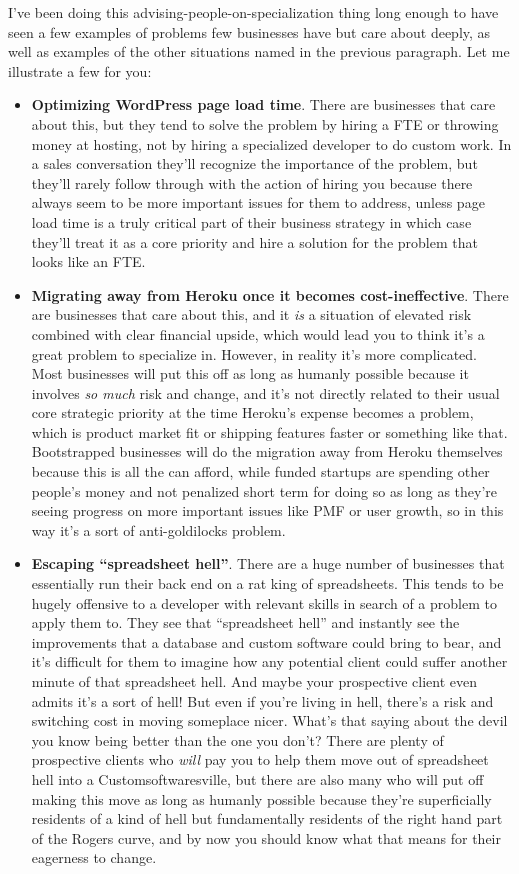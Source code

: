 I've been doing this advising-people-on-specialization thing long enough to have seen a few examples of problems few businesses have but care about deeply, as well as examples of the other situations named in the previous paragraph. Let me illustrate a few for you:

\begin{itemize}
\item \textbf{Optimizing WordPress page load time}. There are businesses that care about this, but they tend to solve the problem by hiring a FTE or throwing money at hosting, not by hiring a specialized developer to do custom work. In a sales conversation they'll recognize the importance of the problem, but they'll rarely follow through with the action of hiring you because there always seem to be more important issues for them to address, unless page load time is a truly critical part of their business strategy in which case they'll treat it as a core priority and hire a solution for the problem that looks like an FTE.
\item \textbf{Migrating away from Heroku once it becomes cost-ineffective}. There are businesses that care about this, and it \emph{is} a situation of elevated risk combined with clear financial upside, which would lead you to think it's a great problem to specialize in. However, in reality it's more complicated. Most businesses will put this off as long as humanly possible because it involves \emph{so much} risk and change, and it's not directly related to their usual core strategic priority at the time Heroku's expense becomes a problem, which is product market fit or shipping features faster or something like that. Bootstrapped businesses will do the migration away from Heroku themselves because this is all the can afford, while funded startups are spending other people's money and not penalized short term for doing so as long as they're seeing progress on more important issues like PMF or user growth, so in this way it's a sort of anti-goldilocks problem.
\item \textbf{Escaping ``spreadsheet hell''}. There are a huge number of businesses that essentially run their back end on a rat king of spreadsheets. This tends to be hugely offensive to a developer with relevant skills in search of a problem to apply them to. They see that ``spreadsheet hell'' and instantly see the improvements that a database and custom software could bring to bear, and it's difficult for them to imagine how any potential client could suffer another minute of that spreadsheet hell. And maybe your prospective client even admits it's a sort of hell! But even if you're living in hell, there's a risk and switching cost in moving someplace nicer. What's that saying about the devil you know being better than the one you don't? There are plenty of prospective clients who \emph{will} pay you to help them move out of spreadsheet hell into a Customsoftwaresville, but there are also many who will put off making this move as long as humanly possible because they're superficially residents of a kind of hell but fundamentally residents of the right hand part of the Rogers curve, and by now you should know what that means for their eagerness to change.
\end{itemize}

